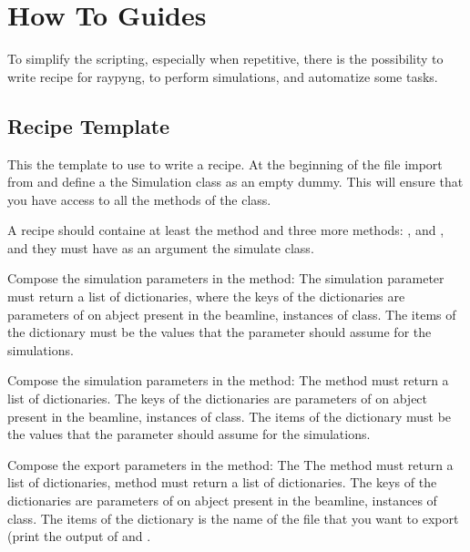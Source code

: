 \documentclass[letterpaper,10pt,english]{sphinxmanual}
\begin{document}
\sphinxstepscope


\chapter{How To Guides}
\label{\detokenize{how_to_guides:how-to-guides}}\label{\detokenize{how_to_guides::doc}}
\sphinxAtStartPar
To simplify the scripting, especially when repetitive,
there is the possibility to write recipe for raypyng, to
perform simulations, and automatize some tasks.


\section{Recipe Template}
\label{\detokenize{how_to_guides:recipe-template}}
\sphinxAtStartPar
This the template to use to write a recipe.
At the beginning of the file import
 from 
and define a the Simulation class as an empty dummy.
This will ensure that you have access to all the methods of the
 class.

\sphinxAtStartPar
A recipe should containe at least the 
method and three more methods: ,
and ,
and they must have as an argument the simulate class.

\sphinxAtStartPar
Compose the simulation parameters in the  method:
The simulation parameter must return a list of dictionaries,
where the keys of the dictionaries are parameters of on abject
present in the beamline, instances of  class.
The items of the dictionary must be the values that the parameter should
assume for the simulations.

\sphinxAtStartPar
Compose the simulation parameters in the  method:
The  method must return a list of dictionaries.
The keys of the dictionaries are parameters of on abject
present in the beamline, instances of  class.
The items of the dictionary must be the values that the parameter should
assume for the simulations.

\sphinxAtStartPar
Compose the export parameters in the  method:
The The  method must return a list of dictionaries,
method must return a list of dictionaries.
The keys of the dictionaries are parameters of on abject
present in the beamline, instances of  class.
The items of the dictionary is the name of the file that you want to export
(print the output of  and
.
\end{document}
